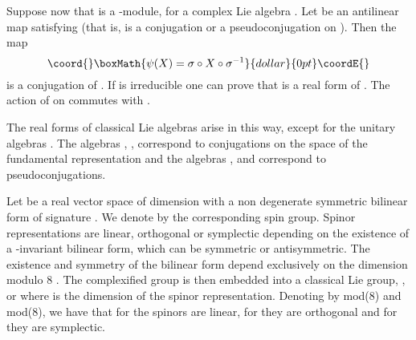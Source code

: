 \documentclass[a4paper,12pt]{article}
\begin{document}
 Suppose
now that  \coordHE{} is  a \myHighlight{$\g$}\coordHE{}-module, for a complex Lie algebra \myHighlight{$\g$}\coordHE{}.
Let \coordHE{} be an antilinear map satisfying
\coordHE{} (that is, \myHighlight{$\sigma$}\coordHE{} is a conjugation or a
pseudoconjugation on \coordHE{}). Then the map $$\coord{}\boxMath{\psi(X)=\sigma\circ
X\circ\sigma^{-1}}{dollar}{0pt}\coordE{}$$ is a conjugation of \myHighlight{$\g$}\coordHE{}. If \coordHE{} is
irreducible one can prove that  \myHighlight{$\g^\psi$}\coordHE{} is a real form of \myHighlight{$\g$}\coordHE{}.
The action of \myHighlight{$\g^\psi$}\coordHE{} on \coordHE{} commutes with \myHighlight{$\sigma$}\coordHE{}.

The real forms of classical Lie algebras arise in this way, except
for the unitary algebras \coordHE{}. The algebras \coordHE{}, \coordHE{}, \coordHE{} correspond to
conjugations on the space of the fundamental representation and
the algebras \coordHE{}, \coordHE{} and \coordHE{} correspond to pseudoconjugations.

\smallskip

Let \coordHE{} be a real vector space of dimension \coordHE{} with  a non
degenerate symmetric bilinear form  of signature  \coordHE{}. We
denote by \coordHE{} the corresponding spin  group. Spinor
representations are linear, orthogonal or symplectic depending on
the existence of a \coordHE{}-invariant  bilinear form,
which can be symmetric or antisymmetric. The existence and
symmetry of the bilinear form depend exclusively on the dimension
\coordHE{} modulo 8 \cite{de}. The complexified group \coordHE{} is then embedded into a classical Lie group, \coordHE{}, \coordHE{} or \coordHE{} where \coordHE{} is the
dimension of the spinor representation. Denoting by \coordHE{} mod(8)
and  \coordHE{} mod(8), we have that  for \coordHE{} the spinors
are linear, for \coordHE{} they are orthogonal and for \coordHE{} they are symplectic.
\end{document}
